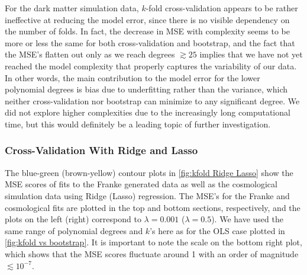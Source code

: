 \documentclass[aps,pra,english,notitlepage,reprint,nofootinbib]{revtex4-1}  %
\begin{document}
For the dark matter simulation data, $k$-fold cross-validation appears to be rather ineffective at reducing the model error, since there is no visible dependency on the number of folds. In fact, the decrease in MSE with complexity seems to be more or less the same for both cross-validation and bootstrap, and the fact that the MSE's flatten out only as we reach degrees $\gtrsim25$ implies that we have not yet reached the model complexity that properly captures the variability of our data. In other words, the main contribution to the model error for the lower polynomial degrees is bias due to underfitting rather than the variance, which neither cross-validation nor bootstrap can minimize to any significant degree. We did not explore higher complexities due to the increasingly long computational time, but this would definitely be a leading topic of further investigation. 


\subsubsection{Cross-Validation With Ridge and Lasso}
The blue-green (brown-yellow) contour plots in \cref{fig:kfold Ridge Lasso} show the MSE scores of fits to the Franke generated data as well as the cosmological simulation data using Ridge (Lasso) regression. The MSE's for the Franke and cosmological fits are plotted in the top and bottom sections, respectively, and the plots on the left (right) correspond to $\lambda=0.001$ ($\lambda=0.5$). We have used the same range of polynomial degrees and $k$'s here as for the OLS case plotted in \cref{fig:kfold vs bootstrap}. It is important to note the scale on the bottom right plot, which shows that the MSE scores fluctuate around 1 with an order of magnitude $\lesssim10^{-7}$. 
\end{document}
